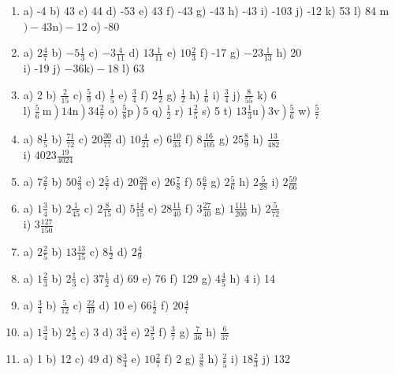 \documentclass[10pt]{article}
\begin{document}
\begin{enumerate}
  \item a) -4 b) 43 c) 44 d) -53 e) 43 f) -43 g) -43 h) -43 i) -103 j) -12 k) 53 l) 84 m\()-43 \mathrm{n})-12\) o) -80
  \item a) \(2 \frac{4}{7}\) b) \(-5 \frac{1}{3}\) c) \(-3 \frac{4}{11}\) d) \(13 \frac{1}{11}\) e) \(10 \frac{2}{3}\) f) -17 g) \(-23 \frac{1}{13}\) h) 20\\
i) -19 j) \(-36 \mathrm{k})-18\) l) 63
  \item a) 2 b) \(\frac{2}{15}\) c) \(\frac{5}{9}\) d) \(\frac{1}{5}\) e) \(\frac{3}{4}\) f) \(2 \frac{1}{2}\) g) \(\frac{1}{2}\) h) \(\frac{1}{6}\) i) \(\frac{3}{4}\) j) \(\frac{8}{55}\) k) 6\\
l) \(\left.\left.\frac{5}{6} \mathrm{~m}\right) 14 \mathrm{n}\right) 34 \frac{2}{7}\) o) \(\left.\frac{5}{8} \mathrm{p}\right) 5\) q) \(\frac{1}{2}\) r) \(1 \frac{2}{5}\) s) 5 t) \(\left.\left.13 \frac{1}{3} \mathrm{u}\right) 3 \mathrm{v}\right) \frac{5}{6}\) w) \(\frac{5}{7}\)
  \item a) \(8 \frac{1}{5}\) b) \(\frac{71}{72}\) c) \(20 \frac{30}{77}\) d) \(10 \frac{4}{21}\) e) \(6 \frac{10}{33}\) f) \(8 \frac{16}{105}\) g) \(25 \frac{8}{9}\) h) \(\frac{13}{482}\)\\
i) \(4023 \frac{19}{4024}\)
  \item a) \(7 \frac{2}{7}\) b) \(50 \frac{2}{3}\) c) \(2 \frac{5}{7}\) d) \(20 \frac{28}{41}\) e) \(26 \frac{7}{8}\) f) \(5 \frac{6}{7}\) g) \(2 \frac{5}{6}\) h) \(2 \frac{5}{28}\) i) \(2 \frac{59}{66}\)
  \item a) \(1 \frac{3}{4}\) b) \(2 \frac{1}{45}\) c) \(2 \frac{8}{15}\) d) \(5 \frac{14}{15}\) e) \(28 \frac{11}{40}\) f) \(3 \frac{27}{40}\) g) \(1 \frac{111}{200}\) h) \(2 \frac{5}{72}\)\\
i) \(3 \frac{127}{150}\)
  \item a) \(2 \frac{2}{5}\) b) \(13 \frac{13}{15}\) c) \(8 \frac{1}{2}\) d) \(2 \frac{4}{9}\)
  \item a) \(1 \frac{2}{3}\) b) \(2 \frac{1}{3}\) c) \(37 \frac{1}{2}\) d) 69 e) 76 f) 129 g) \(4 \frac{4}{5}\) h) 4 i) 14
  \item a) \(\frac{3}{4}\) b) \(\frac{5}{12}\) c) \(\frac{22}{49}\) d) 10 e) \(66 \frac{1}{2}\) f) \(20 \frac{4}{7}\)
  \item a) \(1 \frac{3}{4}\) b) \(2 \frac{1}{5}\) c) 3 d) \(3 \frac{3}{4}\) e) \(2 \frac{3}{5}\) f) \(\frac{3}{7}\) g) \(\frac{7}{36}\) h) \(\frac{6}{37}\)
  \item a) 1 b) 12 c) 49 d) \(8 \frac{3}{4}\) e) \(10 \frac{2}{7}\) f) 2 g) \(\frac{3}{8}\) h) \(\frac{2}{5}\) i) \(18 \frac{2}{3}\) j) 132\\

\end{enumerate}
\end{document}
